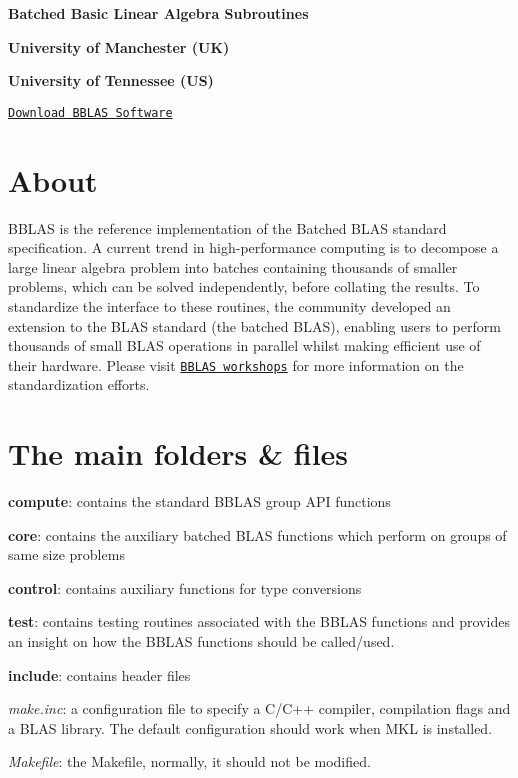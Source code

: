 {\bfseries Batched Basic Linear Algebra Subroutines}

{\bfseries University of Manchester (UK)}

{\bfseries University of Tennessee (US)}





\href{https://github.com/NLAFET/BBLAS/archive/master.zip}{\tt Download B\+B\+L\+AS Software}





\section*{About }

B\+B\+L\+AS is the reference implementation of the Batched B\+L\+AS standard specification. A current trend in high-\/performance computing is to decompose a large linear algebra problem into batches containing thousands of smaller problems, which can be solved independently, before collating the results. To standardize the interface to these routines, the community developed an extension to the B\+L\+AS standard (the batched B\+L\+AS), enabling users to perform thousands of small B\+L\+AS operations in parallel whilst making efficient use of their hardware. Please visit \href{http://icl.utk.edu/bblas}{\tt B\+B\+L\+AS workshops} for more information on the standardization efforts.

\section*{The main folders \& files }


\begin{DoxyItemize}
\item {\bfseries compute}\+: contains the standard B\+B\+L\+AS group A\+PI functions
\item {\bfseries core}\+: contains the auxiliary batched B\+L\+AS functions which perform on groups of same size problems
\item {\bfseries control}\+: contains auxiliary functions for type conversions
\item {\bfseries test}\+: contains testing routines associated with the B\+B\+L\+AS functions and provides an insight on how the B\+B\+L\+AS functions should be called/used.
\item {\bfseries include}\+: contains header files
\item {\itshape make.\+inc}\+: a configuration file to specify a C/\+C++ compiler, compilation flags and a B\+L\+AS library. The default configuration should work when M\+KL is installed.
\item {\itshape Makefile}\+: the Makefile, normally, it should not be modified.
\end{DoxyItemize}

